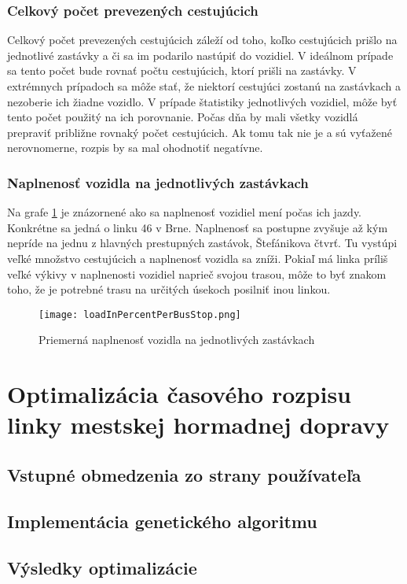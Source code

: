 \subsection*{Celkový počet prevezených cestujúcich}
Celkový počet prevezených cestujúcich záleží od toho, koľko cestujúcich prišlo na jednotlivé zastávky a či sa im podarilo nastúpiť do vozidiel.
V ideálnom prípade sa tento počet bude rovnať počtu cestujúcich, ktorí prišli na zastávky.
V extrémnych prípadoch sa môže stať, že niektorí cestujúci zostanú na zastávkach a nezoberie ich žiadne vozidlo.
V prípade štatistiky jednotlivých vozidiel, môže byť tento počet použitý na ich porovnanie.
Počas dňa by mali všetky vozidlá prepraviť približne rovnaký počet cestujúcich.
Ak tomu tak nie je a sú vyťažené nerovnomerne, rozpis by sa mal ohodnotiť negatívne.

\subsection*{Naplnenosť vozidla na jednotlivých zastávkach}
Na grafe \ref{fig:averageLoad} je znázornené ako sa naplnenosť vozidiel mení počas ich jazdy.
Konkrétne sa jedná o linku 46 v Brne.
Naplnenosť sa postupne zvyšuje až kým nepríde na jednu z hlavných prestupných zastávok, Štefánikova čtvrť.
Tu vystúpi veľké množstvo cestujúcich a naplnenosť vozidla sa zníži.
Pokiaľ má linka príliš veľké výkivy v naplnenosti vozidiel naprieč svojou trasou, môže to byť znakom toho, že je potrebné trasu na určitých úsekoch posilniť inou linkou.
\begin{figure}[h]
  \label{fig:averageLoad}
  \centering
  \texttt{[image: loadInPercentPerBusStop.png]}
  \caption{Priemerná naplnenosť vozidla na jednotlivých zastávkach}
\end{figure}

\chapter{Optimalizácia časového rozpisu linky mestskej hormadnej dopravy} %
\label{optimalizacia}
\section{Vstupné obmedzenia zo strany používateľa}
\section{Implementácia genetického algoritmu}
\section{Výsledky optimalizácie}

